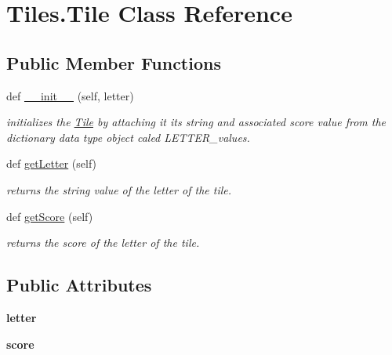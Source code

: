 \hypertarget{class_tiles_1_1_tile}{}\section{Tiles.\+Tile Class Reference}
\label{class_tiles_1_1_tile}
\subsection*{Public Member Functions}
\begin{DoxyCompactItemize}
\item 
def \hyperlink{class_tiles_1_1_tile_ac0b000846904fc226a1b302d1bedd9bc}{\+\_\+\+\_\+init\+\_\+\+\_\+} (self, letter)
\begin{DoxyCompactList}\small\item\em initializes the \hyperlink{class_tiles_1_1_tile}{Tile} by attaching it its string and associated score value from the dictionary data type object caled L\+E\+T\+T\+E\+R\+\_\+values. \end{DoxyCompactList}\item 
def \hyperlink{class_tiles_1_1_tile_a09ce9c2eaba70a0652d2136a6ca3aec2}{get\+Letter} (self)
\begin{DoxyCompactList}\small\item\em returns the string value of the letter of the tile. \end{DoxyCompactList}\item 
def \hyperlink{class_tiles_1_1_tile_a7075f9bb45ff42ff9076aecf2df07a3c}{get\+Score} (self)
\begin{DoxyCompactList}\small\item\em returns the score of the letter of the tile. \end{DoxyCompactList}\end{DoxyCompactItemize}
\subsection*{Public Attributes}
\begin{DoxyCompactItemize}
\item 
\mbox{\label{class_tiles_1_1_tile_ac103fabfab4d828c484226f0dbd1143d}} 
{\bfseries letter}
\item 
\mbox{\label{class_tiles_1_1_tile_a97e89052f5e4e903cd414576780f11d7}} 
{\bfseries score}
\end{DoxyCompactItemize}


